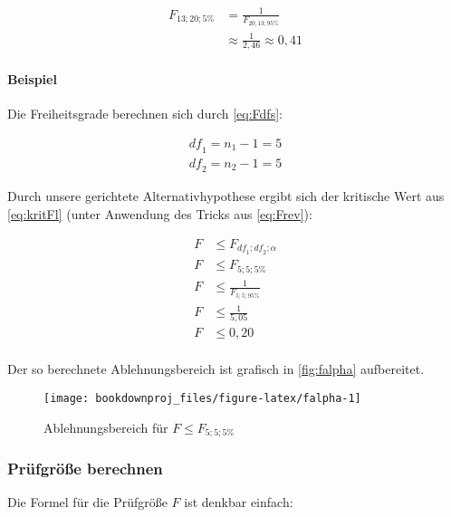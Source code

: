 \documentclass[
  ngerman,
]{article}
\begin{document}
\[\begin{aligned}
F_{13;20;5\%}&=\frac{1}{F_{20;13;95\%}} \\[5pt]
&\approx\frac{1}{2{,}46}\approx0{,}41
\end{aligned}\]

\hypertarget{beispiel-20}{%
\paragraph{Beispiel}\label{beispiel-20}}

Die Freiheitsgrade berechnen sich durch \autoref{eq:Fdfs}:

\[\begin{aligned}
\mathit{df}_1=n_1-1=5\\[4pt]
\mathit{df}_2=n_2-1=5
\end{aligned}\]

Durch unsere gerichtete Alternativhypothese ergibt sich der kritische Wert aus \autoref{eq:kritFl} (unter Anwendung des Tricks aus \autoref{eq:Frev}):

\[\begin{aligned}
F &\leq F_{\mathit{df}_1;\mathit{df}_2;\alpha}\\
F &\leq F_{5;5;5\%}\\[5pt]
F &\leq \frac{1}{F_{5;5;95\%}}\\[5pt]
F &\leq \frac{1}{5{,}05}\\[4pt]
F &\leq 0{,}20\\[4pt]
\end{aligned}\]

Der so berechnete Ablehnungsbereich ist grafisch in \autoref{fig:falpha} aufbereitet.

\begin{figure}[h]

{\centering \texttt{[image: bookdownproj\_files/figure-latex/falpha-1]} 

}

\caption{Ablehnungsbereich für $F \leq F_{5;5;5\%}$}\label{fig:falpha}
\end{figure}

\hypertarget{pruxfcfgruxf6uxdfe-berechnen-3}{%
\subsubsection{Prüfgröße berechnen}\label{pruxfcfgruxf6uxdfe-berechnen-3}}

Die Formel für die Prüfgröße \(F\) ist denkbar einfach:
\end{document}
